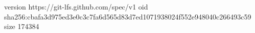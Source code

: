 version https://git-lfs.github.com/spec/v1
oid sha256:cbafa3d975ed3e0c3c7fa6d565d83d7ed1071938024f552e948040c266493c59
size 174384
